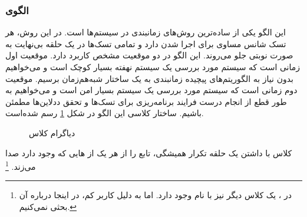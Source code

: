 \subsubsection{الگوی }
\label{scheduleCyclicExecSec}
\begin{RTL}
این الگو یکی از ساده‌ترین روش‌های زمانبندی در سیستم‌ها است. در این روش،
هر تسک شانس مساوی برای اجرا شدن دارد و تمامی تسک‌ها در یک حلقه
بی‌نهایت به صورت نوبتی جلو می‌روند.
این الگو در دو موقعیت مشخص کاربرد دارد. موقعیت اول زمانی است که سیستم
مورد بررسی یک سیستم نهفته بسیار کوچک است و می‌خواهیم بدون نیاز به
الگوریتم‌های پیچیده زمانبندی به یک ساختار شبه‌هم‌زمان برسیم.
موقعیت دوم زمانی است که سیستم مورد بررسی یک سیستم بسیار امن است و
می‌خواهیم به طور قطع از انجام درست فرایند برنامه‌ریزی برای تسک‌ها و تحقق
ددلاین‌ها مطمئن باشیم.
ساختار کلاسی این الگو در شکل \ref{scheduleCyclicExecSecClassDiag}
رسم شده‌است.
\end{RTL}
\begin{figure}[h!]
\centering
{}
\caption{دیاگرام کلاس }
\label{scheduleCyclicExecSecClassDiag}
\end{figure}
\begin{RTL}
کلاس  با داشتن یک حلقه تکرار
همیشگی، تابع  را از هر یک از هایی
که وجود دارد صدا می‌زند. \footnote{در \cite{ref1}، یک کلاس دیگر نیز
با نام  وجود دارد. اما به دلیل کاربر کم، در اینجا درباره
آن بحثی نمی‌کنیم.}
\end{RTL}